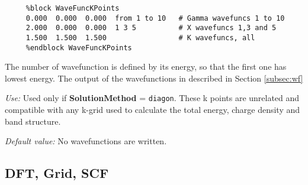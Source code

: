 \documentclass[11pt]{article}
\begin{document}
\begin{description}
\begin{verbatim}
     %block WaveFuncKPoints              
     0.000  0.000  0.000  from 1 to 10   # Gamma wavefuncs 1 to 10
     2.000  0.000  0.000  1 3 5          # X wavefuncs 1,3 and 5
     1.500  1.500  1.500                 # K wavefuncs, all
     %endblock WaveFuncKPoints
\end{verbatim}

The number of wavefunction is defined by its energy, so that the
first one has lowest energy.
The output of the wavefunctions in described in Section \ref{subsec:wf}

{\it Use:} Used only if {\bf SolutionMethod} = {\tt diagon}.
These k points are unrelated and compatible with any k-grid used
to calculate the total energy,  charge density and band structure.

{\it Default value:} No wavefunctions are written.

\end{description}



\vspace{5pt}
\subsection{DFT, Grid, SCF}
\end{document}
